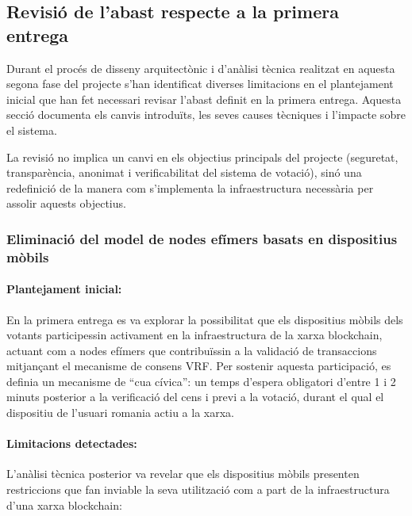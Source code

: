 
\subsection{Revisió de l'abast respecte a la primera entrega}
\label{sec:revisio}

Durant el procés de disseny arquitectònic i d'anàlisi tècnica realitzat en aquesta segona fase del projecte s'han identificat diverses limitacions en el plantejament inicial que han fet necessari revisar l'abast definit en la primera entrega. Aquesta secció documenta els canvis introduïts, les seves causes tècniques i l'impacte sobre el sistema.

La revisió no implica un canvi en els objectius principals del projecte (seguretat, transparència, anonimat i verificabilitat del sistema de votació), sinó una redefinició de la manera com s'implementa la infraestructura necessària per assolir aquests objectius.

\subsubsection{Eliminació del model de nodes efímers basats en dispositius mòbils}

\paragraph{Plantejament inicial:}
En la primera entrega es va explorar la possibilitat que els dispositius mòbils dels votants participessin activament en la infraestructura de la xarxa blockchain, actuant com a nodes efímers que contribuïssin a la validació de transaccions mitjançant el mecanisme de consens VRF. Per sostenir aquesta participació, es definia un mecanisme de ``cua cívica'': un temps d'espera obligatori d'entre 1 i 2 minuts posterior a la verificació del cens i previ a la votació, durant el qual el dispositiu de l'usuari romania actiu a la xarxa.

\paragraph{Limitacions detectades:}
L'anàlisi tècnica posterior va revelar que els dispositius mòbils presenten restriccions que fan inviable la seva utilització com a part de la infraestructura d'una xarxa blockchain:

